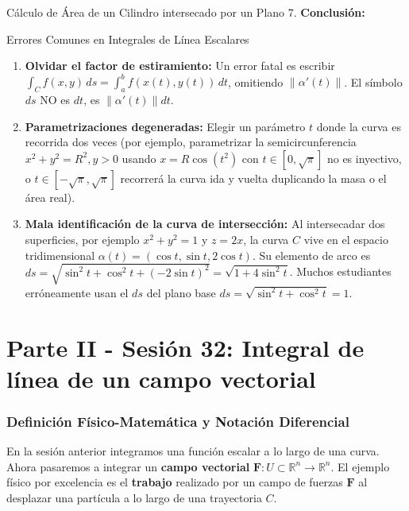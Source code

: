 \documentclass[11pt,a4paper]{article}
\begin{document}
\begin{ejerciciobox}{Cálculo de Área de un Cilindro intersecado por un Plano}
7. \textbf{Conclusión:}
\end{ejerciciobox}

\begin{errorbox}{Errores Comunes en Integrales de Línea Escalares}
\begin{enumerate}
    \item \textbf{Olvidar el factor de estiramiento:} Un error fatal es escribir $\int_C f(x,y) \, ds = \int_a^b f(x(t), y(t)) \, dt$, omitiendo $\|\alpha'(t)\|$. El símbolo $ds$ NO es $dt$, es $\|\alpha'(t)\|dt$.
    \item \textbf{Parametrizaciones degeneradas:} Elegir un parámetro $t$ donde la curva es recorrida dos veces (por ejemplo, parametrizar la semicircunferencia $x^2+y^2=R^2, y>0$ usando $x = R\cos(t^2)$ con $t \in [0, \sqrt{\pi}]$ no es inyectivo, o $t \in [-\sqrt{\pi}, \sqrt{\pi}]$ recorrerá la curva ida y vuelta duplicando la masa o el área real).
    \item \textbf{Mala identificación de la curva de intersección:} Al intersecadar dos superficies, por ejemplo $x^2+y^2=1$ y $z=2x$, la curva $C$ vive en el espacio tridimensional $\alpha(t) = (\cos t, \sin t, 2\cos t)$. Su elemento de arco es $ds = \sqrt{\sin^2 t + \cos^2 t + (-2\sin t)^2} = \sqrt{1+4\sin^2 t}$. Muchos estudiantes erróneamente usan el $ds$ del plano base $ds = \sqrt{\sin^2 t + \cos^2 t} = 1$.
\end{enumerate}
\end{errorbox}



\part*{Parte II - Sesión 32: Integral de línea de un campo vectorial}

\section{Definición Físico-Matemática y Notación Diferencial}

En la sesión anterior integramos una función escalar a lo largo de una curva. Ahora pasaremos a integrar un \textbf{campo vectorial} $\mathbf{F}: U \subset \mathbb{R}^n \to \mathbb{R}^n$. El ejemplo físico por excelencia es el \textbf{trabajo} realizado por un campo de fuerzas $\mathbf{F}$ al desplazar una partícula a lo largo de una trayectoria $C$.
\end{document}
